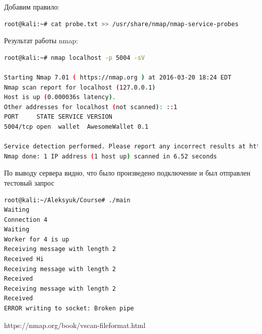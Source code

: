 Добавим правило:

\begin{lstlisting}[language=bash]
root@kali:~# cat probe.txt >> /usr/share/nmap/nmap-service-probes
\end{lstlisting}

Результат работы nmap:

\begin{lstlisting}[language=bash]
root@kali:~# nmap localhost -p 5004 -sV

Starting Nmap 7.01 ( https://nmap.org ) at 2016-03-20 18:24 EDT
Nmap scan report for localhost (127.0.0.1)
Host is up (0.000036s latency).
Other addresses for localhost (not scanned): ::1
PORT     STATE SERVICE VERSION
5004/tcp open  wallet  AwesomeWallet 0.1

Service detection performed. Please report any incorrect results at https://nmap.org/submit/ .
Nmap done: 1 IP address (1 host up) scanned in 6.52 seconds
\end{lstlisting}

По выводу сервера видно, что было произведено подключение и был отправлен тестовый запрос

\begin{lstlisting}[language=bash]
root@kali:~/Aleksyuk/Course# ./main 
Waiting
Connection 4
Waiting
Worker for 4 is up
Receiving message with length 2
Received Hi
Receiving message with length 2
Received 
Receiving message with length 2
Received 
ERROR writing to socket: Broken pipe
\end{lstlisting}

https://nmap.org/book/vscan-fileformat.html